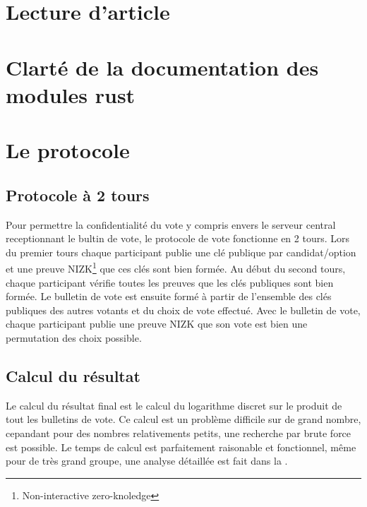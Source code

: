 \documentclass[../report]{subfiles}
\begin{document}
%




\chapter{Lecture d'article}
\chapter{Clarté de la documentation des modules rust}

\chapter{Le protocole}

\section{Protocole à 2 tours}

Pour permettre la confidentialité du vote y compris envers le serveur central receptionnant
le bultin de vote, le protocole de vote fonctionne en 2 tours.
Lors du premier tours chaque participant publie une clé publique par candidat/option et une 
preuve NIZK\footnote{Non-interactive zero-knoledge} que ces clés sont bien formée.
Au début du second tours, chaque participant vérifie toutes les preuves que les clés publiques
sont bien formée.
Le bulletin de vote est ensuite formé à partir de l'ensemble des clés publiques des autres 
votants et du choix de vote effectué.
Avec le bulletin de vote, chaque participant publie une preuve NIZK que son vote est bien 
une permutation des choix possible.

\section{Calcul du résultat}\label{sec:res:proto:resultat}

Le calcul du résultat final est le calcul du logarithme discret sur le produit de tout les 
bulletins de vote.
Ce calcul est un problème difficile sur de grand nombre, cepandant pour des nombres 
relativements petits, une recherche par brute force est possible.
Le temps de calcul est parfaitement raisonable et fonctionnel, même pour de très grand groupe, 
une analyse détaillée est fait dans la .
\end{document}
